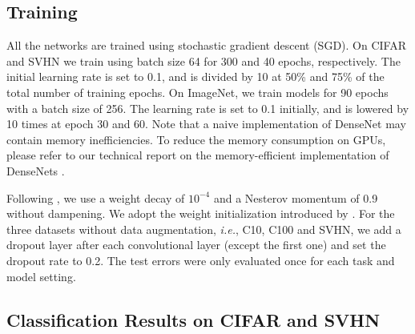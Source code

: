 
\subsection{Training}
All the networks are trained using stochastic gradient descent (SGD). On CIFAR and SVHN we train using batch size 64 for 300 and 40 epochs, respectively. The initial learning rate is set to 0.1, and is divided by 10 at 50\% and 75\% of the total number of training epochs. On ImageNet, we train models for 90 epochs with a batch size of 256. The learning rate is set to 0.1 initially, and is lowered by 10 times at epoch 30 and 60. Note that a naive implementation of DenseNet may contain memory inefficiencies. To reduce the memory consumption on GPUs, please refer to our technical report on the memory-efficient implementation of DenseNets \cite{pleiss2017memory}.


Following \cite{blogresnet}, we use a weight decay of $10^{-4}$ and a Nesterov momentum \cite{nesterov} of 0.9 without dampening. We adopt the weight initialization introduced by \cite{init}. For the three datasets without data augmentation, \emph{i.e.}, C10, C100 and SVHN, we add a dropout layer \cite{dropout} after each convolutional layer (except the first one) and set the dropout rate to 0.2. The test errors were only evaluated once for each task and model setting.





\subsection{Classification Results on CIFAR and SVHN}

